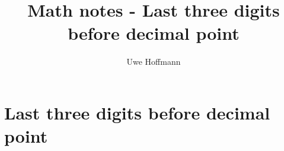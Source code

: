 

\title{Math notes - Last three digits before decimal point}
\author{Uwe Hoffmann}



\setcounter{chapter}{0}
\chapter{Last three digits before decimal point}

